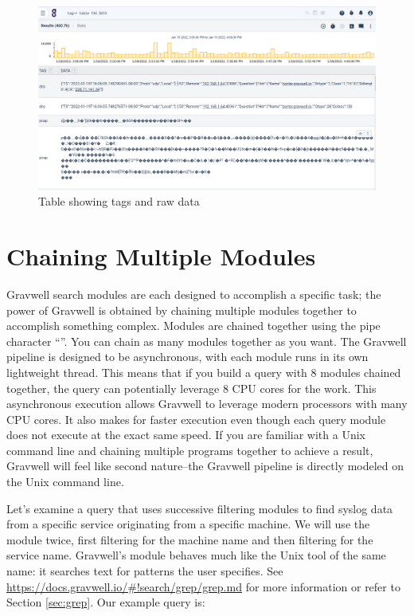 \begin{figure}
	\includegraphics{images/table-tag-data.png}
	\caption{Table showing tags and raw data}
	\label{fig:tag-data-table}
\end{figure}





\section{Chaining Multiple Modules}

Gravwell search modules are each designed to accomplish a specific
task; the power of Gravwell is obtained by chaining multiple modules
together to accomplish something complex. Modules are chained together
using the pipe character ``\textbar{}''. You can chain as many modules
together as you want. The Gravwell pipeline is designed to be
asynchronous, with each module runs in its own lightweight thread. This
means that if you build a query with 8 modules chained together, the
query can potentially leverage 8 CPU cores for the work. This
asynchronous execution allows Gravwell to leverage modern processors
with many CPU cores. It also makes for faster execution even though each
query module does not execute at the exact same speed. If you are
familiar with a Unix command line and chaining multiple programs
together to achieve a result, Gravwell will feel like second
nature--the Gravwell pipeline is directly modeled on the Unix command
line.

Let's examine a query that uses successive filtering modules to find
syslog data from a specific service originating from a specific machine.
We will use the
 module
twice, first filtering for the machine name and then filtering for the
service name. Gravwell's  module behaves much like the Unix tool of the same name: it searches text for patterns the user specifies. See \href{https://docs.gravwell.io/\#!search/grep/grep.md}{https://docs.gravwell.io/\#!search/grep/grep.md} for more information or refer to Section \ref{sec:grep}. Our example query is:

